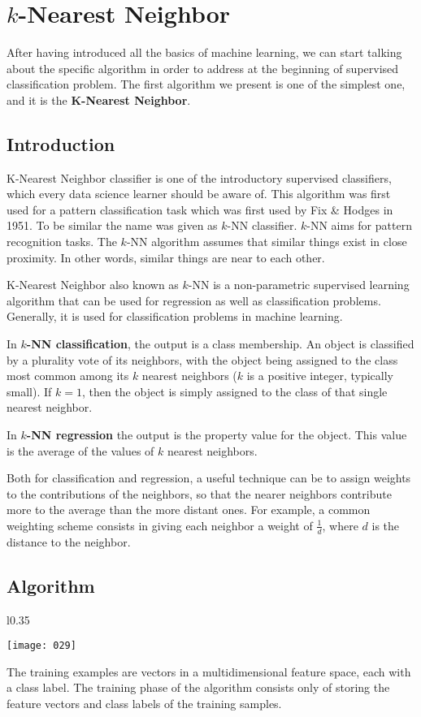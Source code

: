 \chapter{\(k\)-Nearest Neighbor}
After having introduced all the basics of machine learning, we can start talking about the specific algorithm in order to address at the beginning of supervised classification problem. The first algorithm we present is one of the simplest one, and it is the \textbf{K-Nearest Neighbor}.

\section{Introduction}

K-Nearest Neighbor classifier is one of the introductory supervised classifiers, which every data science learner should be aware of. This algorithm was first used for a pattern classification task which was first used by Fix \& Hodges in 1951. To be similar the name was given as \(k\)-NN classifier. \(k\)-NN aims for pattern recognition tasks. The \(k\)-NN algorithm assumes that similar things exist in close proximity. In other words, similar things are near to each other.

K-Nearest Neighbor also known as \(k\)-NN is a non-parametric supervised learning algorithm that can be used for regression as well as classification problems. Generally, it is used for classification problems in machine learning. 

In \textbf{\(k\)-NN classification}, the output is a class membership. An object is classified by a plurality vote of its neighbors, with the object being assigned to the class most common among its \(k\) nearest neighbors (\(k\) is a positive integer, typically small). If \(k=1\), then the object is simply assigned to the class of that single nearest neighbor. 

In \textbf{\(k\)-NN regression} the output is the property value for the object. This value is the average of the values of \(k\) nearest neighbors.

Both for classification and regression, a useful technique can be to assign weights to the contributions of the neighbors, so that the nearer neighbors contribute more to the average than the more distant ones. For example, a common weighting scheme consists in giving each neighbor a weight of \(\frac 1 d\), where \(d\) is the distance to the neighbor.

\section{Algorithm}
\begin{wrapfigure}{l}{0.35\textwidth}
\begin{center}
    \texttt{[image: 029]}
    \caption{}
    \label{fig:029}
\end{center}
\vspace{-40px}
\end{wrapfigure}
The training examples are vectors in a multidimensional feature space, each with a class label. The training phase of the algorithm consists only of storing the feature vectors and class labels of the training samples.

